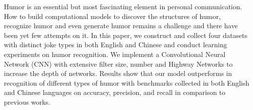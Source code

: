 Humor is an essential but most fascinating element in personal communication. How to build computational models to discover the structures of humor, recognize humor and even generate humor remains a challenge and there have been yet few attempts on it. In this paper, we construct and collect four datasets with distinct joke types in both English and Chinese and conduct learning experiments on humor recognition. We implement a Convolutional Neural Network (CNN) with extensive filter size, number and Highway Networks to increase the depth of networks. Results show that our model outperforms in recognition of different types of humor with benchmarks collected in both English and Chinese languages on accuracy, precision, and recall in comparison to previous works.
